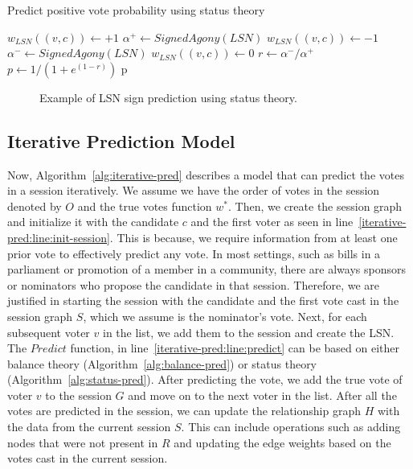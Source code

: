\begin{algorithm}[htp]
    \DontPrintSemicolon
    \caption{Predict positive vote probability using status theory}
    \label{alg:status-pred}
    $w_{LSN}((v,c)) \leftarrow +1$ 
    $\alpha^+ \leftarrow SignedAgony(LSN)$\;
    $w_{LSN}((v,c)) \leftarrow -1$  
    $\alpha^- \leftarrow SignedAgony(LSN)$\;
    $w_{LSN}((v,c)) \leftarrow 0$ 
    $r \leftarrow {\alpha^-}/{\alpha^{+}}$\;
    $p \leftarrow 1/(1+e^{(1-r)})$\;
    \Return p
\end{algorithm}

\begin{figure}[!ht]
    \centering
    
    \caption{Example of LSN sign prediction using status theory.}
    \label{fig:lsn-status}
\end{figure}

\subsection{Iterative Prediction Model}

Now, Algorithm~\ref{alg:iterative-pred} describes a model that can predict the votes in a session iteratively.
We assume we have the order of votes in the session denoted by $O$ and the true votes function $w^{*}$.
Then, we create the session graph and initialize it with the candidate $c$ and the first voter as seen in line~\ref{iterative-pred:line:init-session}.
This is because, we require information from at least one prior vote to effectively predict any vote.
In most settings, such as bills in a parliament or promotion of a member in a community, there are always sponsors or nominators who propose the candidate in that session.
Therefore, we are justified in starting the session with the candidate and the first vote cast in the session graph $S$, which we assume is the nominator's vote.
Next, for each subsequent voter $v$ in the list, we add them to the session and create the LSN.
The $Predict$ function, in line~\ref{iterative-pred:line:predict} can be based on either balance theory (Algorithm~\ref{alg:balance-pred}) or status theory (Algorithm~\ref{alg:status-pred}).
After predicting the vote, we add the true vote of voter $v$ to the session $G$ and move on to the next voter in the list.
After all the votes are predicted in the session, we can update the relationship graph $H$ with the data from the current session $S$.
This can include operations such as adding nodes that were not present in $R$ and updating the edge weights based on the votes cast in the current session.


